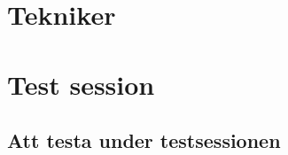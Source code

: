 
\appendix

\chapter{Tekniker}

\appendix

\chapter{Test session}

\section{Att testa under testsessionen}
